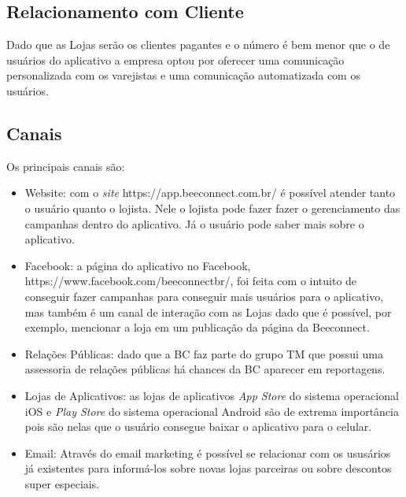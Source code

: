 \subsection{Relacionamento com Cliente}
\label{cha:relacionamento_com_cliente}
Dado que as Lojas serão os clientes pagantes e o número é bem menor que o de usuários do aplicativo a empresa optou por oferecer uma comunicação personalizada com os varejistas e uma comunicação automatizada com os usuários. 

\subsection{Canais}
\label{cha:canais}
Os principais canais são:
\begin{itemize}
\item Website: com o \textit{site} https://app.beeconnect.com.br/ é possível atender tanto o usuário quanto o lojista. Nele o lojista pode fazer fazer o gerenciamento das campanhas dentro do aplicativo. Já o usuário pode saber mais sobre o aplicativo.
\item Facebook: a página do aplicativo no Facebook, https://www.facebook.com/beeconnectbr/, foi feita com o intuito de conseguir fazer campanhas para conseguir mais usuários para o aplicativo, mas também é um canal de interação com as Lojas dado que é possível, por exemplo, mencionar a loja em um publicação da página da Beeconnect.
\item Relações Públicas: dado que a BC faz parte do grupo TM que possui uma assessoria de relações públicas há chances da BC aparecer em reportagens.
\item Lojas de Aplicativos: as lojas de aplicativos \textit{App Store} do sistema operacional iOS e \textit{Play Store} do sistema operacional Android são de extrema importância pois são nelas que o usuário consegue baixar o aplicativo para o celular. 
\item Email: Através do email marketing é possível se relacionar com os ususários já existentes para informá-los sobre novas lojas parceiras ou sobre descontos super especiais.
\end{itemize}

